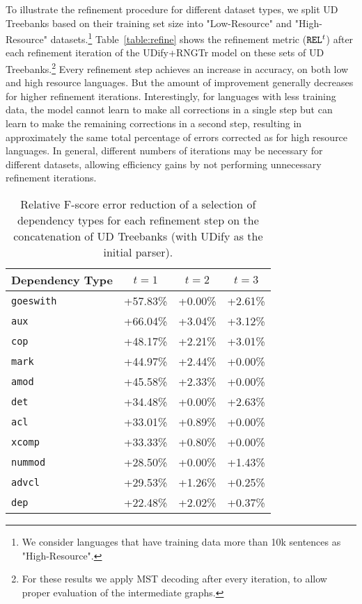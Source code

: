 To illustrate the refinement procedure for different dataset types, we split UD Treebanks based on their training set size into "Low-Resource" and "High-Resource" datasets.\footnote{We consider languages that have training data more than 10k sentences as "High-Resource".}
Table~\ref{table:refine} shows the refinement metric (${\tt REL}^t$) after each refinement iteration of the UDify+RNGTr model on these sets of UD Treebanks.\footnote{For these results we apply MST decoding after every iteration, to allow proper evaluation of the intermediate graphs.}  Every refinement step achieves an increase in accuracy, on both low and high resource languages.  But the amount of improvement generally decreases for higher refinement iterations.  Interestingly, for languages with less training data, the model cannot learn to make all corrections in a single step but can learn to make the remaining corrections in a second step, resulting in approximately the same total percentage of errors corrected as for high resource languages.
In general, different numbers of iterations may be necessary for different datasets, allowing efficiency gains by not performing unnecessary refinement iterations.


\begin{table}
\centering
  \begin{adjustbox}{width=\linewidth}
    \begin{tabular}{|l|c|c|c|}
    \hline
    Dependency Type & $t=1$ & $t=2$ & $t=3$ \\
    \hline
{\tt goeswith } & +57.83\% & +0.00\%  & +2.61\% \\ [-0.5ex]
{\tt aux } & +66.04\% & +3.04\%  & +3.12\%  \\ [-0.5ex]
{\tt cop } & +48.17\% & +2.21\%  & +3.01\%  \\ [-0.5ex]
{\tt mark } & +44.97\% & +2.44\%  & +0.00\%  \\ [-0.5ex]
{\tt amod } & +45.58\% & +2.33\%  & +0.00\% \\ [-0.5ex] 
{\tt det } & +34.48\% & +0.00\%  & +2.63\%  \\ [-0.5ex]
{\tt acl } & +33.01\% & +0.89\%  & +0.00\%  \\ [-0.5ex]
{\tt xcomp } & +33.33\% & +0.80\%  & +0.00\%  \\ [-0.5ex]
{\tt nummod } & +28.50\% & +0.00\%  & +1.43\% \\ [-0.5ex]
{\tt advcl } & +29.53\% & +1.26\%  & +0.25\%  \\ [-0.5ex]
{\tt dep } & +22.48\% & +2.02\%  & +0.37\%  \\ 
    \hline
    \end{tabular}
  \end{adjustbox}
\caption{Relative F-score error reduction of a selection of dependency types for each refinement step on the concatenation of UD Treebanks (with UDify as the initial parser).
\label{table:acc-deptype}}
\end{table}


